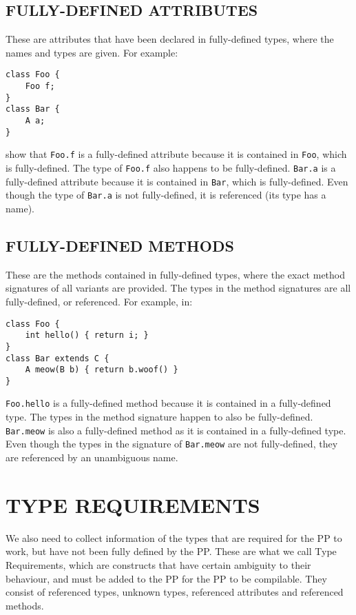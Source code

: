 \documentclass{article}
\begin{document}
\subsection{FULLY-DEFINED ATTRIBUTES}
These are attributes that have been declared in fully-defined types, where the names 
and types are given. For example:

\begin{verbatim}
class Foo {
    Foo f;
}
class Bar {
    A a;
}
\end{verbatim}

\noindent show that \texttt{Foo.f} is a fully-defined attribute because
it is contained in \texttt{Foo},
which is fully-defined. The type of \texttt{Foo.f} also happens to be
fully-defined. \texttt{Bar.a} is a fully-defined attribute because it
is contained in \texttt{Bar},
which is fully-defined. Even though the type of \texttt{Bar.a} is not fully-defined,
it is referenced (its type has a name).

\subsection{FULLY-DEFINED METHODS}
These are the methods contained in fully-defined types,
where the exact method signatures of all variants are provided.
The types in the method signatures are all fully-defined, or referenced.
For example, in:
\begin{verbatim}
class Foo {
    int hello() { return i; }
}
class Bar extends C {
    A meow(B b) { return b.woof() } 
}
\end{verbatim}

\noindent\texttt{Foo.hello} is a fully-defined method because it is contained
in a fully-defined type. The types in the method signature happen to also be fully-defined.
\texttt{Bar.meow} is also a fully-defined method as it is contained in a
fully-defined type. Even though the types in the signature of \texttt{Bar.meow}
are not fully-defined, they are referenced by an unambiguous name.

\section{TYPE REQUIREMENTS}
We also need to collect information of the types that are required for the PP to work,
but have not been fully defined by the PP. These
are what we call Type Requirements, which are constructs that have certain ambiguity
to their behaviour, and
must be added to the PP for the PP to be compilable.
They consist of referenced types, unknown types, referenced attributes and referenced
methods.
\end{document}
